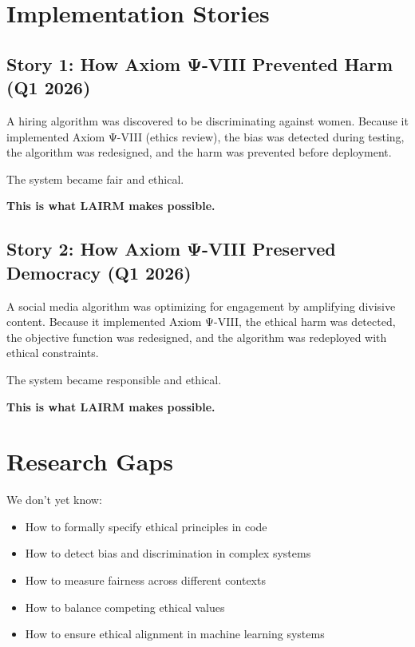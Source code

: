 \vspace{0.5cm}

\section{Implementation Stories}

\subsection{Story 1: How Axiom Ψ-VIII Prevented Harm (Q1 2026)}

A hiring algorithm was discovered to be discriminating against women. Because it implemented Axiom Ψ-VIII (ethics review), the bias was detected during testing, the algorithm was redesigned, and the harm was prevented before deployment.

The system became fair and ethical.

\textbf{This is what LAIRM makes possible.}

\subsection{Story 2: How Axiom Ψ-VIII Preserved Democracy (Q1 2026)}

A social media algorithm was optimizing for engagement by amplifying divisive content. Because it implemented Axiom Ψ-VIII, the ethical harm was detected, the objective function was redesigned, and the algorithm was redeployed with ethical constraints.

The system became responsible and ethical.

\textbf{This is what LAIRM makes possible.}

\vspace{0.5cm}

\section{Research Gaps}

We don't yet know:

\begin{itemize}
    \item How to formally specify ethical principles in code
    
    \item How to detect bias and discrimination in complex systems
    
    \item How to measure fairness across different contexts
    
    \item How to balance competing ethical values
    
    \item How to ensure ethical alignment in machine learning systems
\end{itemize}

